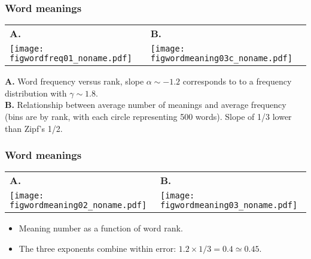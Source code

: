 \begin{frame}
  \frametitle{Word meanings}

  \begin{block}{}
    \begin{tabular}{ll}
      \textbf{A.} & 
      \textbf{B.} \\
      \texttt{[image: figwordfreq01\_noname.pdf]} & 
      \texttt{[image: figwordmeaning03c\_noname.pdf]}
    \end{tabular}

    \textbf{A.} 
    Word frequency versus rank, 
    slope $\alpha \sim -1.2$ corresponds to
    to a frequency distribution with $\gamma \sim 1.8$.\\
    \textbf{B.} 
    Relationship between average number of meanings and 
    average frequency (bins are by rank, with
    each circle representing 500 words).  Slope of 1/3 lower than
    Zipf's 1/2\cite{zipf1949a}.
  \end{block}

\end{frame}


\begin{frame}
  \frametitle{Word meanings}

  \begin{block}{}
    \begin{tabular}{ll}
      \textbf{A.} & 
      \textbf{B.} \\
      \texttt{[image: figwordmeaning02\_noname.pdf]} &
      \texttt{[image: figwordmeaning03\_noname.pdf]} \\
    \end{tabular}
    \begin{itemize}
    \item Meaning number as a function of word rank.
    \item The three exponents combine within error:
      $ 1.2 \times 1/3 = 0.4 \simeq 0.45.$
    \end{itemize}
  \end{block}

\end{frame}


